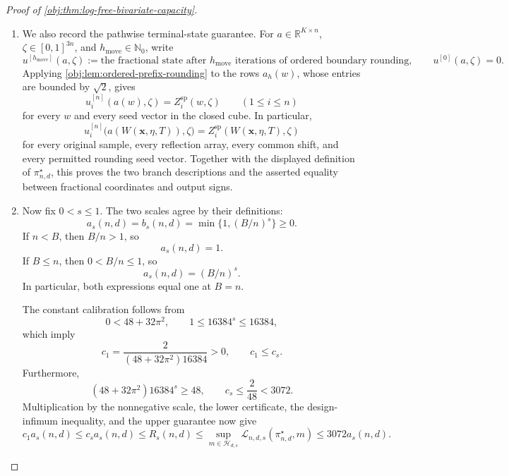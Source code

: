 \documentclass[11pt]{article}
\begin{document}
\begin{proof}[Proof of \cref{obj:thm:log-free-bivariate-capacity}]
\begin{enumerate}
\item
We also record the pathwise terminal-state guarantee. For
\(a\in\mathbb R^{K\times n}\), \(\zeta\in[0,1]^{3n}\), and
\(h_{\mathrm{move}}\in\mathbb N_0\), write
\[
u^{[h_{\mathrm{move}}]}(a,\zeta)
:=
\text{the fractional state after }h_{\mathrm{move}}
\text{ iterations of ordered boundary rounding},
\qquad
u^{[0]}(a,\zeta)=0.
\]
Applying \cref{obj:lem:ordered-prefix-rounding} to the rows
\(a_h(w)\), whose entries are bounded by \(\sqrt2\), gives
\[
u_i^{[n]}(a(w),\zeta)=Z_i^{\mathrm{sp}}(w,\zeta)
\qquad(1\leq i\leq n)
\]
for every \(w\) and every seed vector in the closed cube. In particular,
\[
u_i^{[n]}
\bigl(a(W(\mathbf x,\eta,T)),\zeta\bigr)
=
Z_i^{\mathrm{sp}}(W(\mathbf x,\eta,T),\zeta)
\]
for every original sample, every reflection array, every common shift, and every permitted rounding seed vector. Together with the displayed definition of \(\pi^\star_{n,d}\), this proves the two branch descriptions and the asserted equality between fractional coordinates and output signs.

\item
Now fix \(0<s\leq1\). The two scales agree by their definitions:
\[
a_s(n,d)=b_s(n,d)=\min\{1,(B/n)^s\}\geq0.
\]
If \(n<B\), then \(B/n>1\), so
\[
a_s(n,d)=1.
\]
If \(B\leq n\), then \(0<B/n\leq1\), so
\[
a_s(n,d)=(B/n)^s.
\]
In particular, both expressions equal one at \(B=n\).

The constant calibration follows from
\[
0<48+32\pi^2,
\qquad
1\leq16384^s\leq16384,
\]
which imply
\[
c_1=\frac{2}{(48+32\pi^2)16384}>0,
\qquad
c_1\leq c_s.
\]
Furthermore,
\[
(48+32\pi^2)16384^s\geq48,
\qquad
c_s\leq\frac2{48}<3072.
\]
Multiplication by the nonnegative scale, the lower certificate, the design-infimum inequality, and the upper guarantee now give
\[
c_1a_s(n,d)
\leq c_sa_s(n,d)
\leq R_s(n,d)
\leq
\sup_{m\in\mathcal H_{d,s}}
\mathcal L_{n,d,s}(\pi^\star_{n,d},m)
\leq3072a_s(n,d).
\]


\end{enumerate}
\end{proof}
\end{document}
